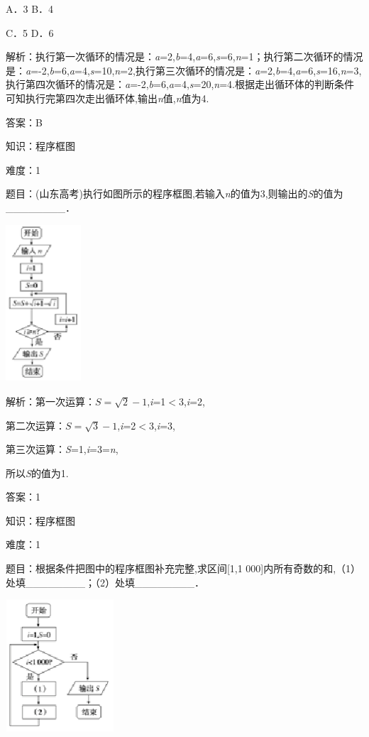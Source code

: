 \documentclass{article} %
\begin{document}
A．3  B．4

C．5  D．6

解析：执行第一次循环的情况是：\textit{a}=2,\textit{b}=4,\textit{a}=6,\textit{s}=6,\textit{n}=1；执行第二次循环的情况是：\textit{a}=-2,\textit{b}=6,\textit{a}=4,\textit{s}=10,\textit{n}=2,执行第三次循环的情况是：\textit{a}=2,\textit{b}=4,\textit{a}=6,\textit{s}=16,\textit{n}=3,执行第四次循环的情况是：\textit{a}=-2,\textit{b}=6,\textit{a}=4,\textit{s}=20,\textit{n}=4.根据走出循环体的判断条件可知执行完第四次走出循环体,输出\textit{n}值,\textit{n}值为4.

答案：B



知识：程序框图

难度：1

题目：(山东高考)执行如图所示的程序框图,若输入\textit{n}的值为3,则输出的\textit{S}的值为\_\_\_\_\_\_\_\_．

\includegraphics*[width=1.10in, height=2.30in, keepaspectratio=false]{image19}

解析：第一次运算：$S=\sqrt{2}-1$,\textit{i}=1$\mathrm{<}$3,\textit{i}=2,

第二次运算：$S=\sqrt{3}-1$,\textit{i}=2$\mathrm{<}$3,\textit{i}=3,

第三次运算：\textit{S}=1,\textit{i}=3=\textit{n},

所以\textit{S}的值为1.

答案：1

知识：程序框图

难度：1

题目：根据条件把图中的程序框图补充完整,求区间[1,1 000]内所有奇数的和,（1）处填\_\_\_\_\_\_\_\_；（2）处填\_\_\_\_\_\_\_\_．

\includegraphics*[width=1.59in, height=1.93in, keepaspectratio=false]{image20}
\end{document}
